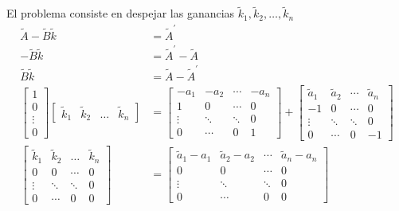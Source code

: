 El problema consiste en despejar las ganancias \( \tilde{k}_{1}, \tilde{k}_{2}, \ldots, \tilde{k}_{n}  \)
\[
    \begin{split}
        \tilde{A} - \tilde{B} \tilde{k} & = \tilde{A}^{'} \\ 
    -\tilde{B} \tilde{k} & = \tilde{A}^{'} - \tilde{A} \\
    \tilde{B} \tilde{k} & = \tilde{A} - \tilde{A}^{'}\\
    \begin{bmatrix}
        1 \\ 0 \\ \vdots \\ 0
    \end{bmatrix}
    \begin{bmatrix}
        \tilde{k}_{1} & \tilde{k}_{2} & \ldots & \tilde{k}_{n}
    \end{bmatrix} & =
    \begin{bmatrix}
        -a_{1} & -a_{2} & \cdots & -a_{n} \\
        1 & 0 & \cdots & 0 \\
        \vdots & \ddots & \ddots & 0 \\
        0 & \cdots & 0 & 1
    \end{bmatrix}
    +
    \begin{bmatrix}
        \tilde{a}_{1} & \tilde{a}_{2} & \cdots & \tilde{a}_{n} \\
        -1 & 0 & \cdots & 0 \\
        \vdots & \ddots & \ddots & 0 \\
        0 & \cdots & 0 & -1
    \end{bmatrix} \\
    \begin{bmatrix}
        \tilde{k}_{1} & \tilde{k}_{2} & \ldots & \tilde{k}_{n} \\
        0 & 0 & \cdots & 0 \\
        \vdots & \ddots & \ddots & 0 \\
        0 & \cdots & 0 & 0
    \end{bmatrix} 
    & =
    \begin{bmatrix}
        \tilde{a}_{1} - a_{1} & \tilde{a}_{2} - a_{2} & \cdots & \tilde{a}_{n} - a_{n} \\
        0 & 0 & \cdots & 0 \\
        \vdots & \ddots & \ddots & 0 \\
        0 & \cdots & 0 & 0
    \end{bmatrix} \\
    \end{split}
\]


